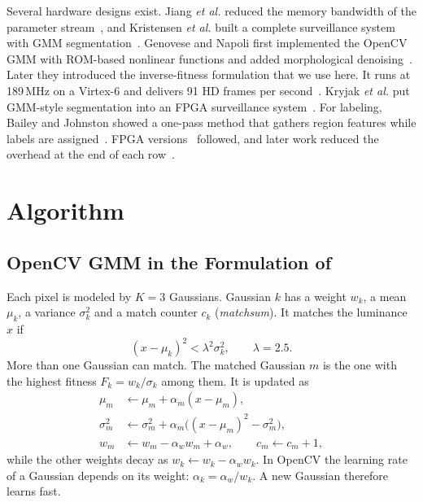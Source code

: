 \documentclass[conference]{IEEEtran}
\begin{document}
Several hardware designs exist. Jiang \emph{et al.} reduced the memory bandwidth
of the parameter stream~\cite{jiang2009}, and Kristensen \emph{et al.} built a
complete surveillance system with GMM segmentation~\cite{kristensen2008}.
Genovese and Napoli first implemented the OpenCV GMM with ROM-based nonlinear
functions and added morphological denoising~\cite{genovese2012}. Later they
introduced the inverse-fitness formulation that we use here. It runs at 189\,MHz
on a Virtex-6 and delivers 91 HD frames per second~\cite{genovese2014}. Kryjak
\emph{et al.} put GMM-style segmentation into an FPGA surveillance
system~\cite{kryjak2011}. For labeling, Bailey and Johnston showed a one-pass
method that gathers region features while labels are assigned~\cite{bailey2007}. FPGA versions~\cite{johnston2008} followed, and later
work reduced the overhead at the end of each row~\cite{ma2008,bailey2019}.

\section{Algorithm}
\subsection{OpenCV GMM in the Formulation of~\cite{genovese2014}}
Each pixel is modeled by $K=3$ Gaussians. Gaussian $k$ has a weight $w_k$, a
mean $\mu_k$, a variance $\sigma_k^2$ and a match counter $c_k$
(\emph{matchsum}). It matches the luminance $x$ if
\begin{equation}
(x-\mu_k)^2 < \lambda^2\sigma_k^2,\qquad \lambda=2.5 .
\label{eq:match}
\end{equation}
More than one Gaussian can match. The matched Gaussian $m$ is the one with the
highest fitness $F_k=w_k/\sigma_k$ among them. It is updated as
\begin{align}
\mu_m &\leftarrow \mu_m+\alpha_m(x-\mu_m),\nonumber\\
\sigma_m^2 &\leftarrow \sigma_m^2+\alpha_m\big((x-\mu_m)^2-\sigma_m^2\big),\nonumber\\
w_m &\leftarrow w_m-\alpha_w w_m+\alpha_w, \qquad c_m\leftarrow c_m+1,
\label{eq:upd}
\end{align}
while the other weights decay as $w_k\leftarrow w_k-\alpha_w w_k$. In OpenCV the
learning rate of a Gaussian depends on its weight: $\alpha_k=\alpha_w/w_k$. A
new Gaussian therefore learns fast.
\end{document}
